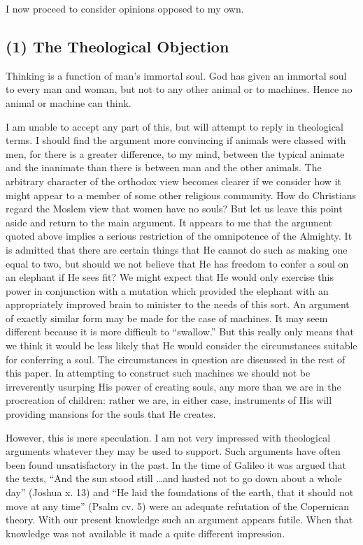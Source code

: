 \documentclass[10pt,twoside,openright]{memoir}
\begin{document}
I now proceed to consider opinions opposed to my own.

\subsection{(1) The Theological Objection}

Thinking is a function of man's immortal soul. God has given an immortal soul to every man and woman, but not to any other animal or to machines. Hence no animal or machine can think.

I am unable to accept any part of this, but will attempt to reply in theological terms. I should find the argument more convincing if animals were classed with men, for there is a greater difference, to my mind, between the typical animate and the inanimate than there is between man and the other animals. The arbitrary character of the orthodox view becomes clearer if we consider how it might appear to a member of some other religious community. How do Christians regard the Moslem view that women have no souls? But let us leave this point aside and return to the main argument. It appears to me that the argument quoted above implies a serious restriction of the omnipotence of the Almighty. It is admitted that there are certain things that He cannot do such as making one equal to two, but should we not believe that He has freedom to confer a soul on an elephant if He sees fit? We might expect that He would only exercise this power in conjunction with a mutation which provided the elephant with an appropriately improved brain to minister to the needs of this sort. An argument of exactly similar form may be made for the case of machines. It may seem different because it is more difficult to ``swallow.'' But this really only means that we think it would be less likely that He would consider the circumstances suitable for conferring a soul. The circumstances in question are discussed in the rest of this paper. In attempting to construct such machines we should not be irreverently usurping His power of creating souls, any more than we are in the procreation of children: rather we are, in either case, instruments of His will providing mansions for the souls that He creates.

However, this is mere speculation. I am not very impressed with theological arguments whatever they may be used to support. Such arguments have often been found unsatisfactory in the past. In the time of Galileo it was argued that the texts, ``And the sun stood still \dots and hasted not to go down about a whole day'' (Joshua x. 13) and ``He laid the foundations of the earth, that it should not move at any time'' (Psalm cv. 5) were an adequate refutation of the Copernican theory. With our present knowledge such an argument appears futile. When that knowledge was not available it made a quite different impression.
\end{document}

